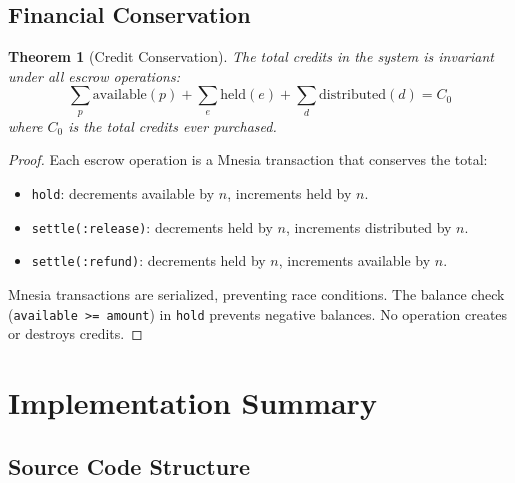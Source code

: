 \documentclass[12pt,a4paper]{article}
\newtheorem{theorem}{Theorem}[section]
\theoremstyle{definition}
\begin{document}
\subsection{Financial Conservation}

\begin{theorem}[Credit Conservation]\label{thm:conservation}
The total credits in the system is invariant under all escrow operations:
\[
  \sum_p \text{available}(p) + \sum_e \text{held}(e) + \sum_d \text{distributed}(d) = C_0
\]
where $C_0$ is the total credits ever purchased.
\end{theorem}

\begin{proof}
Each escrow operation is a Mnesia transaction that conserves the total:

\begin{itemize}
  \item \texttt{hold}: decrements available by $n$, increments held by $n$.
  \item \texttt{settle(:release)}: decrements held by $n$, increments distributed by $n$.
  \item \texttt{settle(:refund)}: decrements held by $n$, increments available by $n$.
\end{itemize}

Mnesia transactions are serialized, preventing race conditions. The balance check
(\texttt{available >= amount}) in \texttt{hold} prevents negative balances.
No operation creates or destroys credits.
\end{proof}


\section{Implementation Summary}\label{sec:implementation}

\subsection{Source Code Structure}
\end{document}
